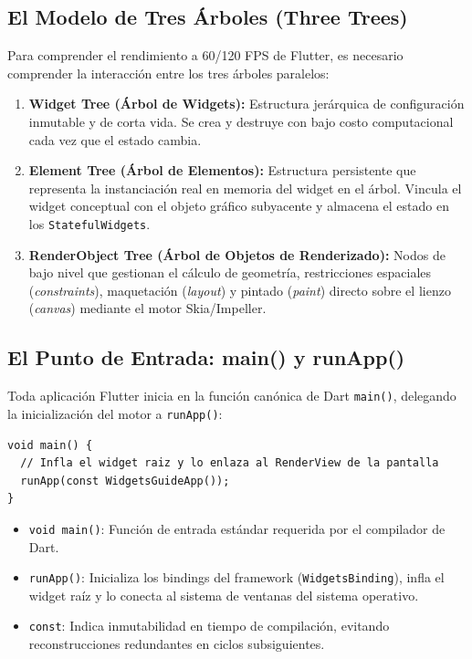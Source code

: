 \documentclass[12pt,a4paper]{article}
\begin{document}
\subsection{El Modelo de Tres Árboles (Three Trees)}
Para comprender el rendimiento a 60/120 FPS de Flutter, es necesario comprender la interacción entre los tres árboles paralelos:
\begin{enumerate}[leftmargin=*]
    \item \textbf{Widget Tree (Árbol de Widgets):} Estructura jerárquica de configuración inmutable y de corta vida. Se crea y destruye con bajo costo computacional cada vez que el estado cambia.
    \item \textbf{Element Tree (Árbol de Elementos):} Estructura persistente que representa la instanciación real en memoria del widget en el árbol. Vincula el widget conceptual con el objeto gráfico subyacente y almacena el estado en los \texttt{StatefulWidgets}.
    \item \textbf{RenderObject Tree (Árbol de Objetos de Renderizado):} Nodos de bajo nivel que gestionan el cálculo de geometría, restricciones espaciales (\textit{constraints}), maquetación (\textit{layout}) y pintado (\textit{paint}) directo sobre el lienzo (\textit{canvas}) mediante el motor Skia/Impeller.
\end{enumerate}

\subsection{El Punto de Entrada: main() y runApp()}
Toda aplicación Flutter inicia en la función canónica de Dart \texttt{main()}, delegando la inicialización del motor a \texttt{runApp()}:

\begin{lstlisting}[caption={Punto de entrada de una aplicación Flutter},label={lst:main}]
void main() {
  // Infla el widget raiz y lo enlaza al RenderView de la pantalla
  runApp(const WidgetsGuideApp());
}
\end{lstlisting}

\begin{itemize}[leftmargin=*]
    \item \texttt{void main()}: Función de entrada estándar requerida por el compilador de Dart.
    \item \texttt{runApp()}: Inicializa los bindings del framework (\texttt{WidgetsBinding}), infla el widget raíz y lo conecta al sistema de ventanas del sistema operativo.
    \item \texttt{const}: Indica inmutabilidad en tiempo de compilación, evitando reconstrucciones redundantes en ciclos subsiguientes.
\end{itemize}
\end{document}
